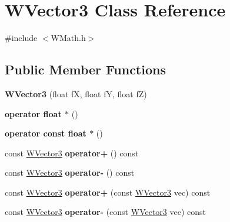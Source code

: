 \hypertarget{class_w_vector3}{}\section{W\+Vector3 Class Reference}
\label{class_w_vector3}


{\ttfamily \#include $<$W\+Math.\+h$>$}

\subsection*{Public Member Functions}
\begin{DoxyCompactItemize}
\item 
{\bfseries W\+Vector3} (float fX, float fY, float fZ)\hypertarget{class_w_vector3_ac60902dccc173c1409bd1bda62701e73}{}\label{class_w_vector3_ac60902dccc173c1409bd1bda62701e73}

\item 
{\bfseries operator float $\ast$} ()\hypertarget{class_w_vector3_a59dba9d31e00890ac4bf1bb37f479e8e}{}\label{class_w_vector3_a59dba9d31e00890ac4bf1bb37f479e8e}

\item 
{\bfseries operator const float $\ast$} ()\hypertarget{class_w_vector3_af40b056190e8b095b35811246a4d0b70}{}\label{class_w_vector3_af40b056190e8b095b35811246a4d0b70}

\item 
const \hyperlink{class_w_vector3}{W\+Vector3} {\bfseries operator+} () const \hypertarget{class_w_vector3_abda98014a0a770d40d5755396863b7c0}{}\label{class_w_vector3_abda98014a0a770d40d5755396863b7c0}

\item 
const \hyperlink{class_w_vector3}{W\+Vector3} {\bfseries operator-\/} () const \hypertarget{class_w_vector3_a47e756114e2454c834ae1b37516d8aaf}{}\label{class_w_vector3_a47e756114e2454c834ae1b37516d8aaf}

\item 
const \hyperlink{class_w_vector3}{W\+Vector3} {\bfseries operator+} (const \hyperlink{class_w_vector3}{W\+Vector3} vec) const \hypertarget{class_w_vector3_a056858c91003898a923dd99839cd6f70}{}\label{class_w_vector3_a056858c91003898a923dd99839cd6f70}

\item 
const \hyperlink{class_w_vector3}{W\+Vector3} {\bfseries operator-\/} (const \hyperlink{class_w_vector3}{W\+Vector3} vec) const \hypertarget{class_w_vector3_a5775f6a85d53eb2700483fdacc25ffd3}{}\label{class_w_vector3_a5775f6a85d53eb2700483fdacc25ffd3}


\end{DoxyCompactItemize}
